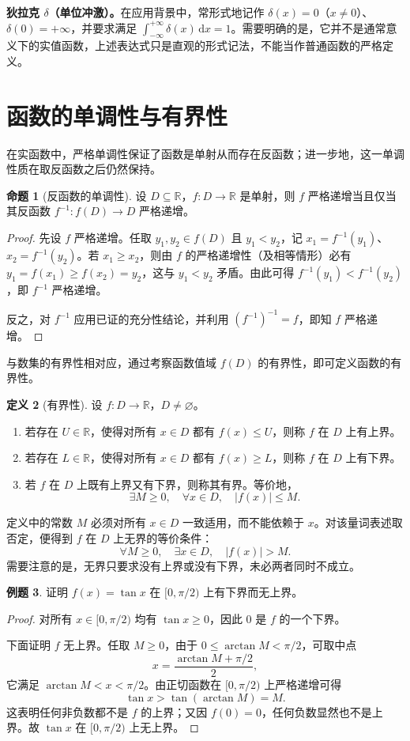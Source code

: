 \documentclass[UTF8, fontset=fandol, a4paper, 12pt]{ctexart}
\newcommand{\R}{\mathbb R}
\theoremstyle{definition}
\newtheorem{definition}{定义}[section]
\newtheorem{proposition}[definition]{命题}
\newtheorem{example}[definition]{例题}
\begin{document}
\textbf{狄拉克 $\delta$（单位冲激）。}在应用背景中，常形式地记作 $\delta(x)=0$（$x\ne0$）、$\delta(0)=+\infty$，并要求满足 $\int_{-\infty}^{+\infty}\delta(x)\,\mathrm dx=1$。需要明确的是，它并不是通常意义下的实值函数，上述表达式只是直观的形式记法，不能当作普通函数的严格定义。

\section{函数的单调性与有界性}
在实函数中，严格单调性保证了函数是单射从而存在反函数；进一步地，这一单调性质在取反函数之后仍然保持。

\begin{proposition}[反函数的单调性]
设 $D\subseteq\R$，$f:D\to\R$ 是单射，则 $f$ 严格递增当且仅当其反函数 $f^{-1}:f(D)\to D$ 严格递增。
\end{proposition}
\begin{proof}
先设 $f$ 严格递增。任取 $y_1,y_2\in f(D)$ 且 $y_1<y_2$，记 $x_1=f^{-1}(y_1)$、$x_2=f^{-1}(y_2)$。若 $x_1\ge x_2$，则由 $f$ 的严格递增性（及相等情形）必有 $y_1=f(x_1)\ge f(x_2)=y_2$，这与 $y_1<y_2$ 矛盾。由此可得 $f^{-1}(y_1)<f^{-1}(y_2)$，即 $f^{-1}$ 严格递增。

反之，对 $f^{-1}$ 应用已证的充分性结论，并利用 $(f^{-1})^{-1}=f$，即知 $f$ 严格递增。
\end{proof}

与数集的有界性相对应，通过考察函数值域 $f(D)$ 的有界性，即可定义函数的有界性。

\begin{definition}[有界性]
设 $f:D\to\R$，$D\ne\varnothing$。
\begin{enumerate}
\item 若存在 $U\in\R$，使得对所有 $x\in D$ 都有 $f(x)\le U$，则称 $f$ 在 $D$ 上有上界。
\item 若存在 $L\in\R$，使得对所有 $x\in D$ 都有 $f(x)\ge L$，则称 $f$ 在 $D$ 上有下界。
\item 若 $f$ 在 $D$ 上既有上界又有下界，则称其有界。等价地，
\[
 \exists M\ge0,\quad\forall x\in D,\quad |f(x)|\le M.
\]
\end{enumerate}
\end{definition}

定义中的常数 $M$ 必须对所有 $x\in D$ 一致适用，而不能依赖于 $x$。对该量词表述取否定，便得到 $f$ 在 $D$ 上无界的等价条件：
\[
 \forall M\ge0,\quad\exists x\in D,\quad |f(x)|>M.
\]
需要注意的是，无界只要求没有上界或没有下界，未必两者同时不成立。

\begin{example}
证明 $f(x)=\tan x$ 在 $[0,\pi/2)$ 上有下界而无上界。
\end{example}
\begin{proof}
对所有 $x\in[0,\pi/2)$ 均有 $\tan x\ge0$，因此 $0$ 是 $f$ 的一个下界。

下面证明 $f$ 无上界。任取 $M\ge0$，由于 $0\le\arctan M<\pi/2$，可取中点
\[
 x=\frac{\arctan M+\pi/2}{2},
\]
它满足 $\arctan M<x<\pi/2$。由正切函数在 $[0,\pi/2)$ 上严格递增可得
\[
 \tan x>\tan(\arctan M)=M.
\]
这表明任何非负数都不是 $f$ 的上界；又因 $f(0)=0$，任何负数显然也不是上界。故 $\tan x$ 在 $[0,\pi/2)$ 上无上界。
\end{proof}
\end{document}
